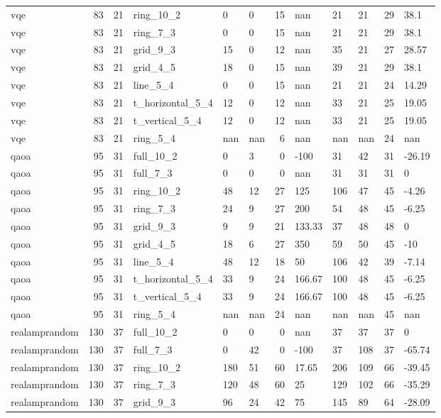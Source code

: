 \begin{longtable}{lrrlllrlllrl}
vqe & 83 & 21 & ring\_10\_2 & 0 & 0 & 15 & nan & 21 & 21 & 29 & 38.1 \\
vqe & 83 & 21 & ring\_7\_3 & 0 & 0 & 15 & nan & 21 & 21 & 29 & 38.1 \\
vqe & 83 & 21 & grid\_9\_3 & 15 & 0 & 12 & nan & 35 & 21 & 27 & 28.57 \\
vqe & 83 & 21 & grid\_4\_5 & 18 & 0 & 15 & nan & 39 & 21 & 29 & 38.1 \\
vqe & 83 & 21 & line\_5\_4 & 0 & 0 & 15 & nan & 21 & 21 & 24 & 14.29 \\
vqe & 83 & 21 & t\_horizontal\_5\_4 & 12 & 0 & 12 & nan & 33 & 21 & 25 & 19.05 \\
vqe & 83 & 21 & t\_vertical\_5\_4 & 12 & 0 & 12 & nan & 33 & 21 & 25 & 19.05 \\
vqe & 83 & 21 & ring\_5\_4 & nan & nan & 6 & nan & nan & nan & 24 & nan \\
qaoa & 95 & 31 & full\_10\_2 & 0 & 3 & 0 & -100 & 31 & 42 & 31 & -26.19 \\
qaoa & 95 & 31 & full\_7\_3 & 0 & 0 & 0 & nan & 31 & 31 & 31 & 0 \\
qaoa & 95 & 31 & ring\_10\_2 & 48 & 12 & 27 & 125 & 106 & 47 & 45 & -4.26 \\
qaoa & 95 & 31 & ring\_7\_3 & 24 & 9 & 27 & 200 & 54 & 48 & 45 & -6.25 \\
qaoa & 95 & 31 & grid\_9\_3 & 9 & 9 & 21 & 133.33 & 37 & 48 & 48 & 0 \\
qaoa & 95 & 31 & grid\_4\_5 & 18 & 6 & 27 & 350 & 59 & 50 & 45 & -10 \\
qaoa & 95 & 31 & line\_5\_4 & 48 & 12 & 18 & 50 & 106 & 42 & 39 & -7.14 \\
qaoa & 95 & 31 & t\_horizontal\_5\_4 & 33 & 9 & 24 & 166.67 & 100 & 48 & 45 & -6.25 \\
qaoa & 95 & 31 & t\_vertical\_5\_4 & 33 & 9 & 24 & 166.67 & 100 & 48 & 45 & -6.25 \\
qaoa & 95 & 31 & ring\_5\_4 & nan & nan & 24 & nan & nan & nan & 45 & nan \\
realamprandom & 130 & 37 & full\_10\_2 & 0 & 0 & 0 & nan & 37 & 37 & 37 & 0 \\
realamprandom & 130 & 37 & full\_7\_3 & 0 & 42 & 0 & -100 & 37 & 108 & 37 & -65.74 \\
realamprandom & 130 & 37 & ring\_10\_2 & 180 & 51 & 60 & 17.65 & 206 & 109 & 66 & -39.45 \\
realamprandom & 130 & 37 & ring\_7\_3 & 120 & 48 & 60 & 25 & 129 & 102 & 66 & -35.29 \\
realamprandom & 130 & 37 & grid\_9\_3 & 96 & 24 & 42 & 75 & 145 & 89 & 64 & -28.09 \\

\end{longtable}
